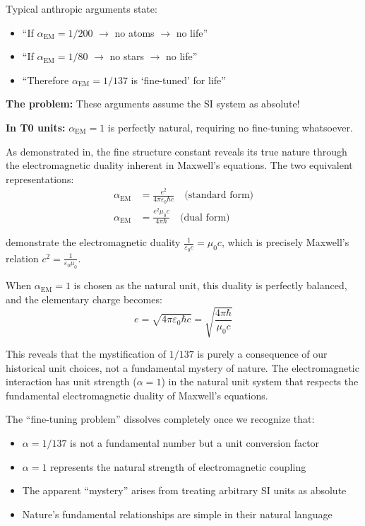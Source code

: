 \documentclass[12pt,a4paper]{article}
\newcommand{\alphaEM}{\alpha_{\text{EM}}}
\begin{document}
	Typical anthropic arguments state:
	\begin{itemize}
		\item ``If $\alphaEM = 1/200$ $\rightarrow$ no atoms $\rightarrow$ no life''
		\item ``If $\alphaEM = 1/80$ $\rightarrow$ no stars $\rightarrow$ no life''
		\item ``Therefore $\alphaEM = 1/137$ is `fine-tuned' for life''
	\end{itemize}
	
	\textbf{The problem:} These arguments assume the SI system as absolute!
	
	\textbf{In T0 units:} $\alphaEM = 1$ is perfectly natural, requiring no fine-tuning whatsoever.
	
	As demonstrated in\cite{pascher_feinstruktur_2025}, the fine structure constant reveals its true nature through the electromagnetic duality inherent in Maxwell's equations. The two equivalent representations:
	\begin{align}
		\alphaEM &= \frac{e^2}{4\pi\varepsilon_0\hbar c} \quad \text{(standard form)}\\
		\alphaEM &= \frac{e^2 \mu_0 c}{4\pi \hbar} \quad \text{(dual form)}
	\end{align}
	
	demonstrate the electromagnetic duality $\frac{1}{\varepsilon_0 c} = \mu_0 c$, which is precisely Maxwell's relation $c^2 = \frac{1}{\varepsilon_0\mu_0}$.
	
	When $\alphaEM = 1$ is chosen as the natural unit, this duality is perfectly balanced, and the elementary charge becomes:
	$$e = \sqrt{4\pi\varepsilon_0\hbar c} = \sqrt{\frac{4\pi\hbar}{\mu_0 c}}$$
	
	This reveals that the mystification of $1/137$ is purely a consequence of our historical unit choices, not a fundamental mystery of nature. The electromagnetic interaction has unit strength ($\alpha = 1$) in the natural unit system that respects the fundamental electromagnetic duality of Maxwell's equations.
	
	The ``fine-tuning problem'' dissolves completely once we recognize that:
	\begin{itemize}
		\item $\alpha = 1/137$ is not a fundamental number but a unit conversion factor
		\item $\alpha = 1$ represents the natural strength of electromagnetic coupling
		\item The apparent ``mystery'' arises from treating arbitrary SI units as absolute
		\item Nature's fundamental relationships are simple in their natural language
	\end{itemize}
	
\end{document}
